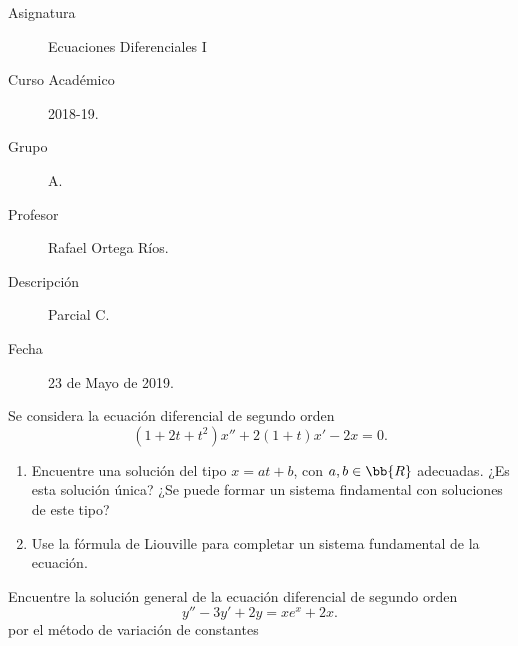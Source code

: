 \documentclass[12pt]{article}
\begin{document}

    
    

    \begin{description}
        \item[Asignatura] Ecuaciones Diferenciales I
        \item[Curso Académico] 2018-19.
        \item[Grupo] A.
        \item[Profesor] Rafael Ortega Ríos.
        \item[Descripción] Parcial C.
        \item[Fecha] 23 de Mayo de 2019.
    \end{description}
    \newpage

    \begin{ejercicio}
    Se considera la ecuación diferencial de segundo orden
    \begin{equation*}
        (1+2t+t^2)x''+2(1+t)x'-2x=0.
    \end{equation*}
    \begin{enumerate}
        \item Encuentre una solución del tipo $x=at+b$, con $a,b\in\bb{R}$ adecuadas. ¿Es esta solución única? ¿Se puede formar un sistema findamental con soluciones de este tipo?
        \item Use la fórmula de Liouville para completar un sistema fundamental de la ecuación.
    \end{enumerate}
    \end{ejercicio}

    \begin{ejercicio}
        Encuentre la solución general de la ecuación diferencial de segundo orden
        \begin{equation*}
            y''-3y'+2y=xe^x +2x.
        \end{equation*}
        por el método de variación de constantes
    \end{ejercicio}
\end{document}
